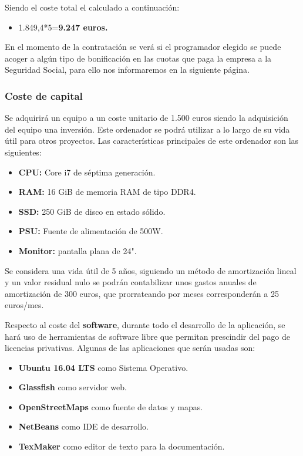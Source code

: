 Siendo el coste total el calculado a continuación:

\begin{itemize}
	\item 1.849,4*5=\textbf{9.247 euros.}
\end{itemize}

En el momento de la contratación se verá si el programador elegido se puede acoger a algún tipo de bonificación en las cuotas que paga la empresa a la Seguridad Social, para ello nos informaremos en la siguiente página.


\subsubsection{Coste de capital}
Se adquirirá un equipo a un coste unitario de 1.500 euros siendo la adquisición del equipo una inversión. Este ordenador se podrá utilizar a lo largo de su vida útil para otros proyectos. Las características principales de este ordenador son las siguientes:

\begin{itemize}
	\item \textbf{CPU:} Core i7 de séptima generación.
	\item \textbf{RAM:} 16 GiB de memoria RAM de tipo DDR4.
	\item \textbf{SSD:} 250 GiB de disco en estado sólido.
	\item \textbf{PSU:} Fuente de alimentación de 500W.
	\item \textbf{Monitor:} pantalla plana de 24".
\end{itemize}

Se considera una vida útil de 5 años, siguiendo un método de amortización lineal y un valor residual nulo se podrán contabilizar unos gastos anuales de amortización de 300 euros, que prorrateando por meses corresponderán a 25 euros/mes.

Respecto al coste del \textbf{software}, durante todo el desarrollo de la aplicación, se hará uso de herramientas de software libre que permitan prescindir del pago de licencias privativas. Algunas de las aplicaciones que serán usadas son:

\begin{itemize}
	\item \textbf{Ubuntu 16.04 LTS} como Sistema Operativo.
	\item \textbf{Glassfish} como servidor web.
	\item \textbf{OpenStreetMaps} como fuente de datos y mapas.
	\item \textbf{NetBeans} como IDE de desarrollo.
	\item \textbf{TexMaker} como editor de texto para la documentación.
\end{itemize}

